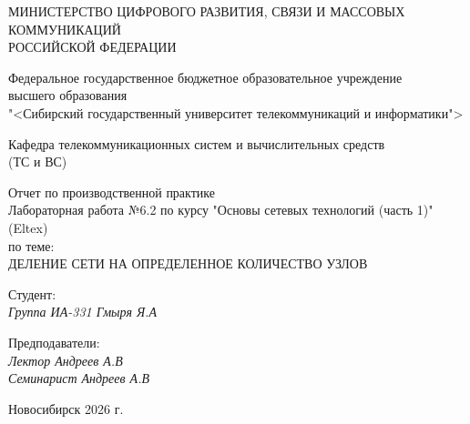 \thispagestyle{empty}

\begin{center}
    МИНИСТЕРСТВО ЦИФРОВОГО РАЗВИТИЯ, СВЯЗИ И МАССОВЫХ КОММУНИКАЦИЙ \\ РОССИЙСКОЙ ФЕДЕРАЦИИ

    \vspace{20pt}

    Федеральное государственное бюджетное образовательное учреждение  \\  высшего образования \\
    "<Сибирский государственный университет телекоммуникаций и информатики"> \\

    \vspace{20pt}

    Кафедра телекоммуникационных систем и вычислительных средств \\  (ТС и ВС)
\end{center}

\vfill

\begin{center}
    Отчет по производственной практике \\  
    Лабораторная работа №6.2 по курсу "Основы сетевых технологий (часть 1)" (Eltex) \\
    \vspace{20pt}
    по теме: \\
    \uppercase{Деление сети на определенное количество узлов}
\end{center}

\vfill

    \noindent Студент: \\
    \textit{Группа ИА-331 \hfill Гмыря Я.А} 

    \vspace{20pt}
 
    \noindent Предподаватели: \\
    \textit{Лектор \hfill Андреев А.В} \\
    \textit{Семинарист \hfill Андреев А.В}

\vfill

\begin{center}
    Новосибирск 2026 г.
\end{center}